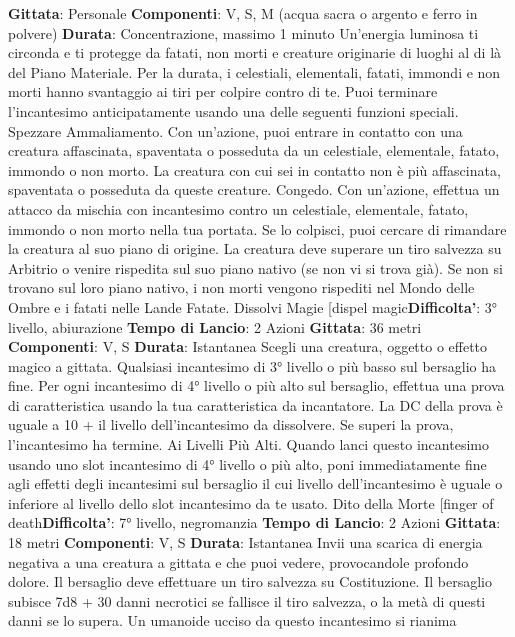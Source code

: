 \begin{multicols}{2}
\textbf{Gittata}: Personale
\textbf{Componenti}: V, S, M (acqua sacra o argento e ferro in
polvere)
\textbf{Durata}: Concentrazione, massimo 1 minuto
Un’energia luminosa ti circonda e ti protegge da fatati,
non morti e creature originarie di luoghi al di là del
Piano Materiale. Per la durata, i celestiali, elementali,
fatati, immondi e non morti hanno svantaggio ai tiri per
colpire contro di te.
Puoi terminare l’incantesimo anticipatamente usando
una delle seguenti funzioni speciali.
Spezzare Ammaliamento. Con un’azione, puoi entrare
in contatto con una creatura affascinata, spaventata o
posseduta da un celestiale, elementale, fatato,
immondo o non morto. La creatura con cui sei in
contatto non è più affascinata, spaventata o posseduta
da queste creature.
Congedo. Con un’azione, effettua un attacco da
mischia con incantesimo contro un celestiale,
elementale, fatato, immondo o non morto nella tua
portata. Se lo colpisci, puoi cercare di rimandare la
creatura al suo piano di origine. La creatura deve
superare un tiro salvezza su Arbitrio o venire rispedita
sul suo piano nativo (se non vi si trova già). Se non si
trovano sul loro piano nativo, i non morti vengono
rispediti nel Mondo delle Ombre e i fatati nelle Lande
Fatate.
Dissolvi Magie
[dispel magic\textbf{Difficolta'}:
3° livello, abiurazione
\textbf{Tempo di Lancio}: 2 Azioni
\textbf{Gittata}: 36 metri
\textbf{Componenti}: V, S
\textbf{Durata}: Istantanea
Scegli una creatura, oggetto o effetto magico a gittata.
Qualsiasi incantesimo di 3° livello o più basso sul
bersaglio ha fine. Per ogni incantesimo di 4° livello o più
alto sul bersaglio, effettua una prova di caratteristica
usando la tua caratteristica da incantatore. La DC della
prova è uguale a 10 + il livello dell’incantesimo da
dissolvere. Se superi la prova, l’incantesimo ha termine.
Ai Livelli Più Alti. Quando lanci questo incantesimo
usando uno slot incantesimo di 4° livello o più alto, poni
immediatamente fine agli effetti degli incantesimi sul
bersaglio il cui livello dell’incantesimo è uguale o
inferiore al livello dello slot incantesimo da te usato.
Dito della Morte
[finger of death\textbf{Difficolta'}:
7° livello, negromanzia
\textbf{Tempo di Lancio}: 2 Azioni
\textbf{Gittata}: 18 metri
\textbf{Componenti}: V, S
\textbf{Durata}: Istantanea
Invii una scarica di energia negativa a una creatura a
gittata e che puoi vedere, provocandole profondo
dolore. Il bersaglio deve effettuare un tiro salvezza su
Costituzione. Il bersaglio subisce 7d8 + 30 danni
necrotici se fallisce il tiro salvezza, o la metà di questi
danni se lo supera.
Un umanoide ucciso da questo incantesimo si rianima

\end{multicols}
